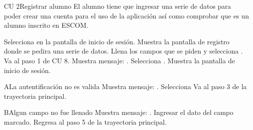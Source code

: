 \begin{UseCase} {CU 2}{Registrar alumno}{
	El alumno tiene que ingresar una serie de datos para poder crear una cuenta para el uso de la aplicación así como comprobar que es un alumno inscrito en ESCOM.
}





\end{UseCase}


\begin{UCtrayectoria}
	
	\UCpaso [\UCactor]	Selecciona  en la pantalla de inicio de sesión. 
	\UCpaso [\UCsist]Muestra la pantalla de registro donde se pedira una serie de datos.
	\UCpaso [\UCactor]Llena los campos que se piden y selecciona .
	\UCpaso Va al paso 1 de CU 8.
	\UCpaso [\UCsist]Muestra mensaje: .
	\UCpaso [\UCactor]Selecciona .
	\UCpaso [\UCsist]Muestra la pantalla de inicio de sesión.
\end{UCtrayectoria}



\begin{UCtrayectoriaA}{A}{La autentificación no es valida}
	\UCpaso [\UCsist]Muestra mensaje: .
	\UCpaso [\UCactor]	Selecciona 
	\UCpaso Va al paso 3 de la trayectoria principal.
\end{UCtrayectoriaA}

\begin{UCtrayectoriaA}{B}{Algun campo no fue llenado}
	\UCpaso [\UCsist]Muestra mensaje: .
	\UCpaso [\UCactor]	Ingresar el dato del campo marcado.
	\UCpaso Regresa al paso 5 de la trayectoria principal.
\end{UCtrayectoriaA}
